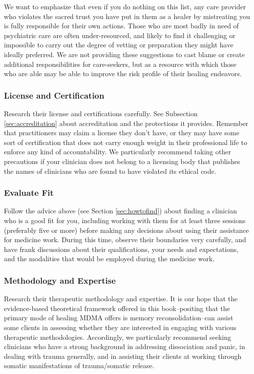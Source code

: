 \documentclass[12pt,letterpaper]{book}
\begin{document}
We want to emphasize that even if you do nothing on this list, any care provider who violates the sacred trust you have put in them as a healer by mistreating you is fully responsible for their own actions. Those who are most badly in need of psychiatric care are often under-resourced, and likely to find it challenging or impossible to carry out the degree of vetting or preparation they might have ideally preferred. We are not providing these suggestions to cast blame or create additional responsibilities for care-seekers, but as a resource with which those who are able may be able to improve the risk profile of their healing endeavors.

\subsubsection*{License and Certification}
Research their license and certifications carefully. See Subsection \ref{sec:accreditation} about accreditation and the protections it provides. Remember that practitioners may claim a license they don't have, or they may have some sort of certification that does not carry enough weight in their professional life to enforce any kind of accountability. We particularly recommend taking other precautions if your clinician does not belong to a licensing body that publishes the names of clinicians who are found to have violated its ethical code.

\subsubsection*{Evaluate Fit}
Follow the advice above (see Section \ref{sec:howtofind}) about finding a clinician who is a good fit for you, including working with them for at least three sessions (preferably five or more) before making any decisions about using their assistance for medicine work. During this time, observe their boundaries very carefully, and have frank discussions about their qualifications, your needs and expectations, and the modalities that would be employed during the medicine work.

\subsubsection*{Methodology and Expertise}
Research their therapeutic methodology and expertise.  It is our hope that the evidence-based theoretical framework offered in this book–positing that the primary mode of healing MDMA offers is memory reconsolidation–can assist some clients in assessing whether they are interested in engaging with various therapeutic methodologies. Accordingly, we particularly recommend seeking clinicians who have a strong background in addressing dissociation and panic, in dealing with trauma generally, and in assisting their clients at working through somatic manifestations of trauma/somatic release.
\end{document}
